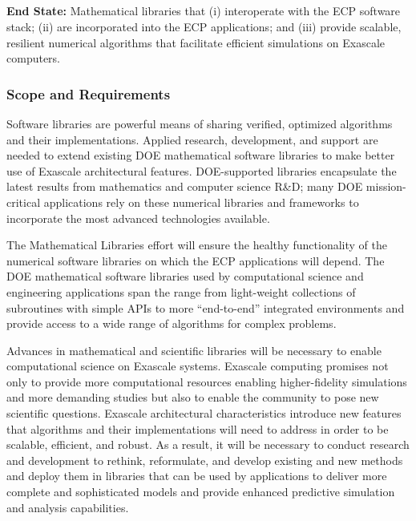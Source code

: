 \subsection{ \mathlibs}

\textbf{End State:} Mathematical libraries that (i) interoperate with the ECP software stack; (ii) are incorporated into the ECP applications; and (iii) provide scalable, resilient numerical algorithms that facilitate efficient simulations on Exascale computers.

\subsubsection{Scope and Requirements}
Software libraries are powerful means of sharing verified, optimized algorithms and their implementations. Applied research, development, and support are needed to extend existing DOE mathematical software libraries to make better use of Exascale architectural features. DOE-supported libraries encapsulate the latest results from mathematics and computer science R\&D; many DOE mission-critical applications rely on these numerical libraries and frameworks to incorporate the most advanced technologies available. 

The Mathematical Libraries effort will ensure the healthy functionality of the numerical software libraries on which the ECP applications will depend. The DOE mathematical software libraries used by computational science and engineering applications span the range from light-weight collections of subroutines with simple APIs to more “end-to-end” integrated environments and provide access to a wide range of algorithms for complex problems.

Advances in mathematical and scientific libraries will be necessary to enable computational science on Exascale systems. Exascale computing promises not only to provide more computational resources enabling higher-fidelity simulations and more demanding studies but also to enable the community to pose new scientific questions. Exascale architectural characteristics introduce new features that algorithms and their implementations will need to address in order to be scalable, efficient, and robust. As a result, it will be necessary to conduct research and development to rethink, reformulate, and develop existing and new methods and deploy them in libraries that can be used by applications to deliver more complete and sophisticated models and provide enhanced predictive simulation and analysis capabilities.

